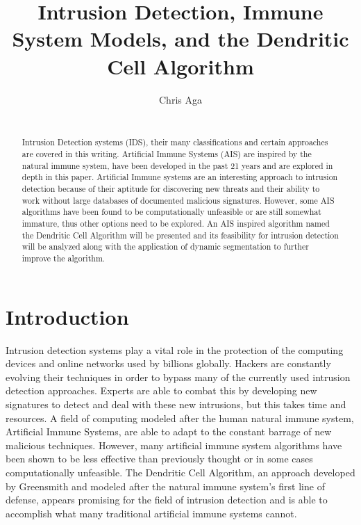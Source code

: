 \documentclass{umm-senior-sem}
\begin{document}
\title{Intrusion Detection, Immune System Models, and the Dendritic Cell Algorithm}
\author{
\alignauthor
Chris Aga \\
 \\
}

\maketitle

\begin{abstract}
Intrusion Detection systems (IDS), their many classifications and certain approaches are covered in this writing. Artificial Immune Systems (AIS) are inspired by the natural immune system, have been developed in the past 21 years and are explored in depth in this paper. Artificial Immune systems are an interesting approach to intrusion detection because of their aptitude for discovering new threats and their ability to work without large databases of documented malicious signatures. However, some AIS algorithms have been found to be computationally unfeasible or are still somewhat immature, thus other options need to be explored. An AIS inspired algorithm named the Dendritic Cell Algorithm will be presented and its feasibility for intrusion detection will be analyzed along with the application of dynamic segmentation to further improve the algorithm.
\end{abstract}


\section{Introduction}
Intrusion detection systems play a vital role in the protection of the computing devices and online networks used by billions 
globally. Hackers are constantly evolving their techniques in order to bypass many of the currently used intrusion detection approaches. Experts are able to combat this by developing new signatures to detect and deal with these new intrusions, but this takes time and resources. A field of computing modeled after the human natural immune system, Artificial Immune Systems, are able to adapt to the constant barrage of new malicious techniques. However, many artificial immune system algorithms have been shown to be less effective than previously thought or in some cases computationally unfeasible. The Dendritic Cell Algorithm, an approach developed by Greensmith \cite{greensmith_thesis:2007} and modeled after the natural immune system's first line of defense, appears promising for the field of intrusion detection and is able to accomplish what many traditional artificial immune systems cannot. 
\end{document}
